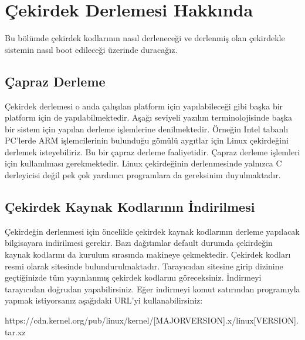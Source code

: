 \documentclass[a4paper,10pt,turkish]{sphinxmanual}
\begin{document}
\section{Çekirdek Derlemesi Hakkında}
\label{\detokenize{kernelcompilation:cekirdek-derlemesi-hakkinda}}
\sphinxAtStartPar
Bu bölümde çekirdek kodlarının nasıl derleneceği ve derlenmiş olan çekirdekle sistemin nasıl boot
edileceği üzerinde duracağız.


\subsection{Çapraz Derleme}
\label{\detokenize{kernelcompilation:capraz-derleme}}
\sphinxAtStartPar
Çekirdek derlemesi o anda çalışılan platform için yapılabileceği gibi başka bir platform için de
yapılabilmektedir. Aşağı seviyeli yazılım terminolojisinde başka bir sistem için yapılan derleme
işlemlerine  denilmektedir. Örneğin Intel tabanlı PC’lerde ARM
işlemcilerinin bulunduğu gömülü aygıtlar için Linux çekirdeğini derlemek isteyebiliriz. Bu bir
çapraz derleme faaliyetidir. Çapraz derleme işlemleri için  kullanılması gerekmektedir. Linux çekirdeğinin derlenmesinde yalnızca C derleyicisi
değil pek çok yardımcı programlara da gereksinim duyulmaktadır.


\subsection{Çekirdek Kaynak Kodlarının İndirilmesi}
\label{\detokenize{kernelcompilation:cekirdek-kaynak-kodlarinin-indirilmesi}}
\sphinxAtStartPar
Çekirdeğin derlenmesi için öncelikle çekirdek kaynak kodlarının derleme yapılacak bilgisayara
indirilmesi gerekir. Bazı dağıtımlar default durumda çekirdeğin kaynak kodlarını da kurulum sırasında
makineye çekmektedir. Çekirdek kodları resmi olarak  sitesinde bulundurulmaktadır.
Tarayıcıdan  sitesine girip  dizinine geçtiğinizde tüm yayınlanmış
çekirdek kodlarını göreceksiniz. İndirmeyi tarayıcıdan doğrudan yapabilirsiniz. Eğer indirmeyi komut
satırından  programıyla yapmak istiyorsanız aşağıdaki URL’yi kullanabilirsiniz:

\begin{sphinxVerbatim}[commandchars=\\\{\}]
https://cdn.kernel.org/pub/linux/kernel/[MAJOR\PYGZus{}VERSION].x/linux\PYGZhy{}[VERSION].tar.xz
\end{sphinxVerbatim}
\end{document}
